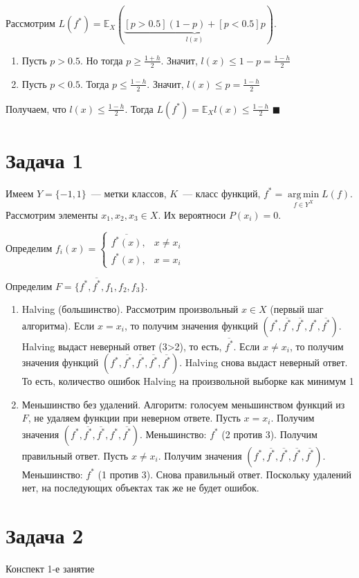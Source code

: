 \documentclass[a4paper]{article}
\DeclareMathOperator*{\argmin}{arg\,min}
\begin{document}
Рассмотрим $L(f^*)=\mathbb{E}_X\left(\underbrace{[p>0.5](1-p)+[p<0.5]p}_{l(x)}\right)$.

\begin{enumerate}
\item Пусть $p>0.5$. Но тогда $p\geqslant \frac{1+h}{2}$. Значит, $l(x)\leqslant 1-p=\frac{1-h}{2}$
\item Пусть $p<0.5$. Тогда $p\leqslant \frac{1-h}{2}$. Значит, $l(x)\leqslant p=\frac{1-h}{2}$
\end{enumerate}

Получаем, что $l(x)\leqslant \frac{1-h}{2}$. Тогда $L(f^*)=\mathbb{E}_Xl(x)\leqslant \frac{1-h}{2}$ $\blacksquare$
\section*{Задача 1}
Имеем $Y=\{-1,1\}$~--- метки классов, $K$~--- класс функций, $f^*=\argmin\limits_{f\in Y^X} L(f)$. Рассмотрим элементы $x_1,x_2,x_3\in X$. Их вероятноси $P(x_i)=0$.

Определим $f_i(x)=\begin{cases}
\overline{f^*(x)},&x\neq x_i\\
f^*(x),&x=x_i
\end{cases}$

Определим $F=\{f^*, \overline{f^*}, f_1, f_2, f_3\}$.

\begin{enumerate}
\item Halving (большинство). Рассмотрим произвольный $x\in X$ (первый шаг алгоритма). Если $x=x_i$, то получим значения функций $(f^*, \overline{f^*}, \overline{f^*},f^*,\overline{f^*})$. Halving выдаст неверный ответ (3>2), то есть, $\overline{f^*}$. Если $x\neq x_i$, то получим значения функций $(f^*, \overline{f^*}, \overline{f^*},\overline{f^*},\overline{f^*})$. Halving снова выдаст неверный ответ. То есть, количество ошибок Halving на произвольной выборке как минимум 1
\item Меньшинство без удалений. Алгоритм: голосуем меньшинством функций из $F$, не удаляем функции при неверном ответе. Пусть $x=x_i$. Получим значения $(f^*, \overline{f^*}, \overline{f^*},f^*,\overline{f^*})$. Меньшинство: $f^*$ (2 против 3). Получим правильный ответ. Пусть $x\neq x_i$. Получим значения $(f^*, \overline{f^*}, \overline{f^*},\overline{f^*},\overline{f^*})$. Меньшинство: $f^*$ (1 против 3). Снова правильный ответ. Поскольку удалений нет, на последующих объектах так же не будет ошибок.
\end{enumerate}
\section*{Задача 2}
Конспект 1-е занятие
\end{document}
